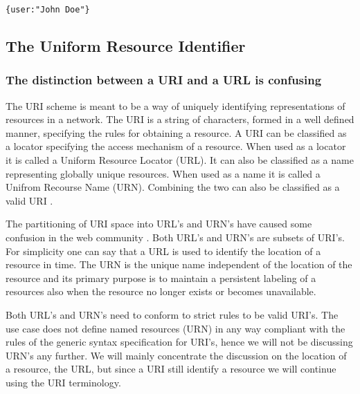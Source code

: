 \documentclass[english]{ifimaster}
\begin{document}
\begin{lstlisting}[caption= {The object returned from the "popstate" event when navigating back.},label={lst:pushStatePop}]
 {user:"John Doe"}
\end{lstlisting}

\subsection{The Uniform Resource Identifier}
\label{sec:URI}
\subsubsection{The distinction between a URI and a URL is confusing}
The URI scheme is meant to be a way of uniquely identifying representations of resources in a network. The URI is a string of characters, formed in a well defined manner, specifying the rules for obtaining a resource. A URI can be classified as a locator specifying the access mechanism of a resource. When used as a locator it is called a Uniform Resource Locator (URL). It can also be classified as a name representing globally unique resources. When used as a name it is called a Unifrom Recourse Name (URN). Combining the two can also be classified as a valid URI \parencite{rfc_URI}.

The partitioning of URI space into URL's and URN's have caused some confusion in the web community \parencite{w3c_URI}. Both URL's and URN's are subsets of URI's. For simplicity one can say that a URL is used to identify the location of a resource in time. The URN is the unique name independent of the location of the resource and its primary purpose is to maintain a persistent labeling of a resources also when the resource no longer exists or becomes unavailable. 

Both URL's and URN's need to conform to strict rules to be valid URI's. The use case does not define named resources (URN) in any way compliant with the rules of the generic syntax specification for URI's, hence we will not be discussing URN's any further. We will mainly concentrate the discussion on the location of a resource, the URL, but since a URI still identify a resource we will continue using the URI terminology. 
\end{document}
